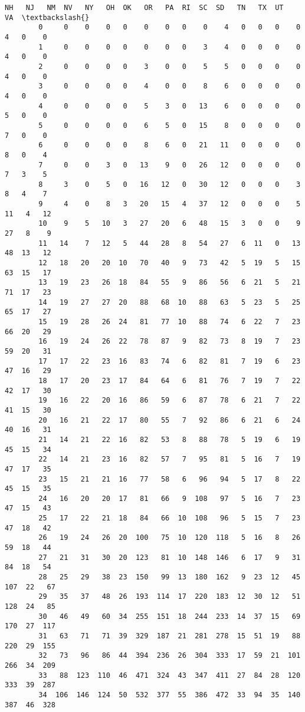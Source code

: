 \documentclass[11pt]{article}
\begin{document}
\begin{Verbatim}[commandchars=\\\{\}]
             NH   NJ   NM  NV   NY   OH  OK   OR   PA  RI  SC  SD   TN   TX  UT   VA  \textbackslash{}
        0     0    0    0   0    0    0   0    0    4   0   0   0    0    4   0    0   
        1     0    0    0   0    0    0   0    3    4   0   0   0    0    4   0    0   
        2     0    0    0   0    3    0   0    5    5   0   0   0    0    4   0    0   
        3     0    0    0   0    4    0   0    8    6   0   0   0    0    4   0    0   
        4     0    0    0   0    5    3   0   13    6   0   0   0    0    5   0    0   
        5     0    0    0   0    6    5   0   15    8   0   0   0    0    7   0    0   
        6     0    0    0   0    8    6   0   21   11   0   0   0    0    8   0    4   
        7     0    0    3   0   13    9   0   26   12   0   0   0    0    7   3    5   
        8     3    0    5   0   16   12   0   30   12   0   0   0    3    8   4    7   
        9     4    0    8   3   20   15   4   37   12   0   0   0    5   11   4   12   
        10    9    5   10   3   27   20   6   48   15   3   0   0    9   27   8    9   
        11   14    7   12   5   44   28   8   54   27   6  11   0   13   48  13   12   
        12   18   20   20  10   70   40   9   73   42   5  19   5   15   63  15   17   
        13   19   23   26  18   84   55   9   86   56   6  21   5   21   71  17   23   
        14   19   27   27  20   88   68  10   88   63   5  23   5   25   65  17   27   
        15   19   28   26  24   81   77  10   88   74   6  22   7   23   66  20   29   
        16   19   24   26  22   78   87   9   82   73   8  19   7   23   59  20   31   
        17   17   22   23  16   83   74   6   82   81   7  19   6   23   47  16   29   
        18   17   20   23  17   84   64   6   81   76   7  19   7   22   42  17   30   
        19   16   22   20  16   86   59   6   87   78   6  21   7   22   41  15   30   
        20   16   21   22  17   80   55   7   92   86   6  21   6   24   40  16   31   
        21   14   21   22  16   82   53   8   88   78   5  19   6   19   45  15   34   
        22   14   21   23  16   82   57   7   95   81   5  16   7   19   47  17   35   
        23   15   21   21  16   77   58   6   96   94   5  17   8   22   45  15   35   
        24   16   20   20  17   81   66   9  108   97   5  16   7   23   47  15   43   
        25   17   22   21  18   84   66  10  108   96   5  15   7   23   47  18   42   
        26   19   24   26  20  100   75  10  120  118   5  16   8   26   59  18   44   
        27   21   31   30  20  123   81  10  148  146   6  17   9   31   84  18   54   
        28   25   29   38  23  150   99  13  180  162   9  23  12   45  107  22   67   
        29   35   37   48  26  193  114  17  220  183  12  30  12   51  128  24   85   
        30   46   49   60  34  255  151  18  244  233  14  37  15   69  170  27  117   
        31   63   71   71  39  329  187  21  281  278  15  51  19   88  220  29  155   
        32   73   96   86  44  394  236  26  304  333  17  59  21  101  266  34  209   
        33   88  123  110  46  471  324  43  347  411  27  84  28  120  333  39  287   
        34  106  146  124  50  532  377  55  386  472  33  94  35  140  387  46  328   
        

\end{Verbatim}
\end{document}

